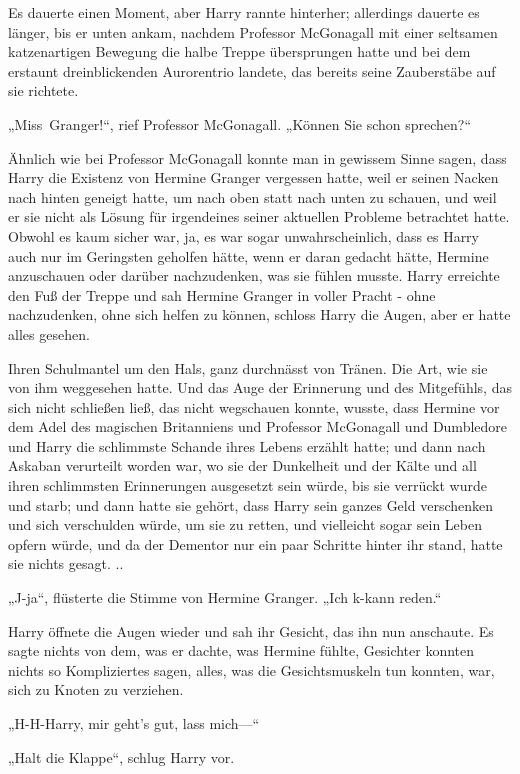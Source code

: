 {Es dauerte einen Moment, aber Harry rannte hinterher; allerdings dauerte es länger, bis er unten ankam, nachdem Professor McGonagall mit einer seltsamen katzenartigen Bewegung die halbe Treppe übersprungen hatte und bei dem erstaunt dreinblickenden Aurorentrio landete, das bereits seine Zauberstäbe auf sie richtete.

„Miss~Granger!“, rief Professor McGonagall. „Können Sie schon sprechen?“

Ähnlich wie bei Professor McGonagall konnte man in gewissem Sinne sagen, dass Harry die Existenz von Hermine Granger vergessen hatte, weil er seinen Nacken nach hinten geneigt hatte, um nach oben statt nach unten zu schauen, und weil er sie nicht als Lösung für irgendeines seiner aktuellen Probleme betrachtet hatte. Obwohl es kaum sicher war, ja, es war sogar unwahrscheinlich, dass es Harry auch nur im Geringsten geholfen hätte, wenn er daran gedacht hätte, Hermine anzuschauen oder darüber nachzudenken, was sie fühlen musste. Harry erreichte den Fuß der Treppe und sah Hermine Granger in voller Pracht - ohne nachzudenken, ohne sich helfen zu können, schloss Harry die Augen, aber er hatte alles gesehen.

Ihren Schulmantel um den Hals, ganz durchnässt von Tränen. Die Art, wie sie von ihm weggesehen hatte. Und das Auge der Erinnerung und des Mitgefühls, das sich nicht schließen ließ, das nicht wegschauen konnte, wusste, dass Hermine vor dem Adel des magischen Britanniens und Professor McGonagall und Dumbledore und Harry die schlimmste Schande ihres Lebens erzählt hatte; und dann nach Askaban verurteilt worden war, wo sie der Dunkelheit und der Kälte und all ihren schlimmsten Erinnerungen ausgesetzt sein würde, bis sie verrückt wurde und starb; und dann hatte sie gehört, dass Harry sein ganzes Geld verschenken und sich verschulden würde, um sie zu retten, und vielleicht sogar sein Leben opfern würde, und da der Dementor nur ein paar Schritte hinter ihr stand, hatte sie nichts gesagt. ..

„J-ja“, flüsterte die Stimme von Hermine Granger. „Ich k-kann reden.“

Harry öffnete die Augen wieder und sah ihr Gesicht, das ihn nun anschaute. Es sagte nichts von dem, was er dachte, was Hermine fühlte, Gesichter konnten nichts so Kompliziertes sagen, alles, was die Gesichtsmuskeln tun konnten, war, sich zu Knoten zu verziehen.

„H-H-Harry, mir geht's gut, lass mich—“

„Halt die Klappe“, schlug Harry vor.

}
